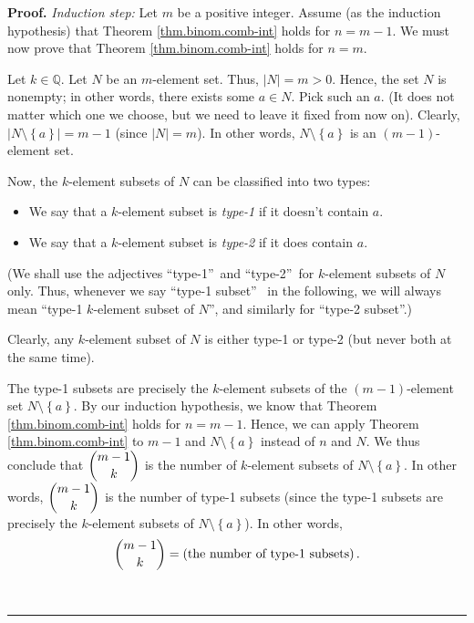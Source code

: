 \documentclass[numbers=enddot,12pt,final,onecolumn,notitlepage]{scrartcl}%
\numberwithin{exer}{subsection}
\theoremstyle{definition}
\newenvironment{proof}[1][Proof]{\noindent\textbf{#1.} }{\ \rule{0.5em}{0.5em}}
\begin{document}
\begin{proof}
\textit{Induction step:} Let $m$ be a positive integer. Assume (as the
induction hypothesis) that Theorem \ref{thm.binom.comb-int} holds for $n=m-1$.
We must now prove that Theorem \ref{thm.binom.comb-int} holds for $n=m$.

Let $k\in\mathbb{Q}$. Let $N$ be an $m$-element set. Thus, $\left\vert
N\right\vert =m>0$. Hence, the set $N$ is nonempty; in other words, there
exists some $a\in N$. Pick such an $a$. (It does not matter which one we
choose, but we need to leave it fixed from now on). Clearly, $\left\vert
N\setminus\left\{  a\right\}  \right\vert =m-1$ (since $\left\vert
N\right\vert =m$). In other words, $N\setminus\left\{  a\right\}  $ is an
$\left(  m-1\right)  $-element set.

Now, the $k$-element subsets of $N$ can be classified into two types:

\begin{itemize}
\item We say that a $k$-element subset is \textit{type-1} if it doesn't
contain $a$.

\item We say that a $k$-element subset is \textit{type-2} if it does contain
$a$.
\end{itemize}

(We shall use the adjectives \textquotedblleft type-1\textquotedblright\ and
\textquotedblleft type-2\textquotedblright\ for $k$-element subsets of $N$
only. Thus, whenever we say \textquotedblleft type-1 subset\textquotedblright%
\ in the following, we will always mean \textquotedblleft type-1 $k$-element
subset of $N$\textquotedblright, and similarly for \textquotedblleft type-2
subset\textquotedblright.)

Clearly, any $k$-element subset of $N$ is either type-1 or type-2 (but never
both at the same time).

The type-1 subsets are precisely the $k$-element subsets of the $\left(
m-1\right)  $-element set $N\setminus\left\{  a\right\}  $. By our induction
hypothesis, we know that Theorem \ref{thm.binom.comb-int} holds for $n=m-1$.
Hence, we can apply Theorem \ref{thm.binom.comb-int} to $m-1$ and
$N\setminus\left\{  a\right\}  $ instead of $n$ and $N$. We thus conclude that
$\dbinom{m-1}{k}$ is the number of $k$-element subsets of $N\setminus\left\{
a\right\}  $. In other words, $\dbinom{m-1}{k}$ is the number of type-1
subsets (since the type-1 subsets are precisely the $k$-element subsets of
$N\setminus\left\{  a\right\}  $). In other words,%
\begin{equation}
\dbinom{m-1}{k}=\left(  \text{the number of type-1 subsets}\right)  .
\label{pf.thm.binom.comb-int.IS.1}%
\end{equation}



\end{proof}
\end{document}
